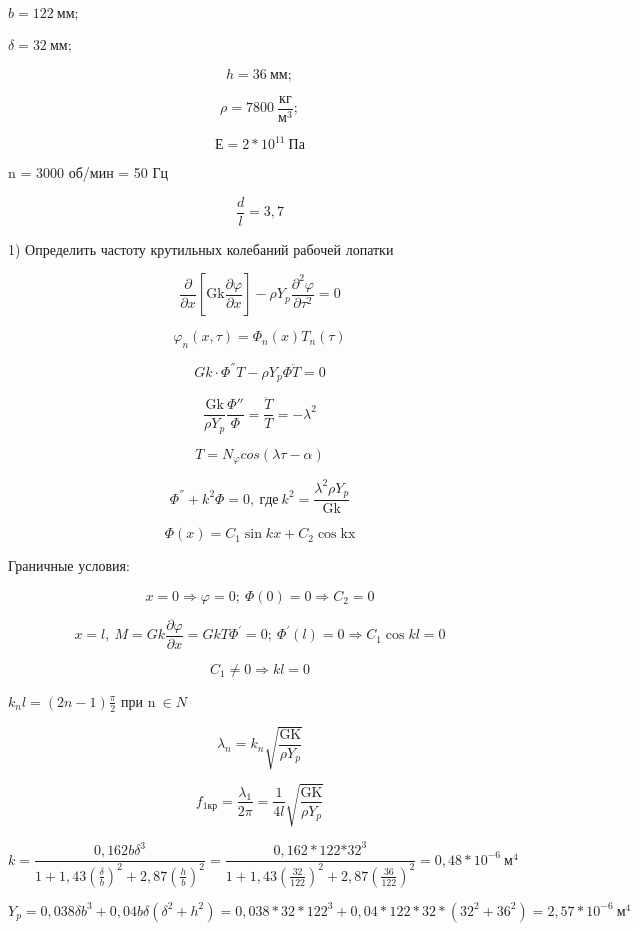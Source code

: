 \(b = 122\ мм;\)

\(\delta = 32\ мм;\) \(\ \)

\[h = 36\ мм;\]

\[\rho = 7800\ \frac{кг}{м^{3}};\]

\[Е = 2*10^{11}\ Па\]

n = 3000 об/мин = 50 Гц

\[\frac{d}{l} = 3,7\]

1) Определить частоту крутильных колебаний рабочей лопатки

\[\frac{\partial}{\partial x}\left\lbrack \text{Gk}\frac{\partial\varphi}{\partial x} \right\rbrack - \rho Y_{p}\frac{\partial^{2}\varphi}{\partial\tau^{2}} = 0\]

\[\varphi_{n}\left( x,\tau \right) = \Phi_{n}(x)T_{n}\left( \tau \right)\]

\[Gk\cdot\Phi^{''}T - \rho Y_{p}\Phi\ddot{T} = 0\]

\[\frac{\text{Gk}}{\rho Y_{p}}\frac{\Phi''}{\Phi} = \frac{\ddot{T}}{T} = - \lambda^{2}\]

\[T = N_{\varphi}cos(\lambda\tau - \alpha)\]

\[\Phi^{''} + k^{2}\Phi = 0,\ где\ k^{2} = \frac{\lambda^{2}\rho Y_{p}}{\text{Gk}}\]

\[\Phi\left( x \right) = C_{1}\sin{kx + C_{2}\cos\text{kx}}\]

Граничные условия:

\[x = 0 \Rightarrow \varphi = 0;\ \Phi\left( 0 \right) = 0 \Rightarrow C_{2} = 0\]

\[x = l,\ M = Gk\frac{\partial\varphi}{\partial x} = GkT\Phi^{'} = 0;\ \Phi^{'}\left( l \right) = 0 \Rightarrow C_{1}\cos{kl = 0}\]

\[C_{1} \neq 0 \Rightarrow kl = 0\]

\(k_{n}l = (2n - 1)\frac{\pi}{2}\) при n\(\  \in N\)

\[\lambda_{n} = k_{n}\sqrt{\frac{\text{GK}}{\rho Y_{p}}}\]

\[f_{1кр} = \frac{\lambda_{1}}{2\pi} = \frac{1}{4l}\sqrt{\frac{\text{GK}}{\rho Y_{p}}}\]

\[k = \frac{0,162b\delta^{3}}{1 + 1,43\left( \frac{\delta}{b} \right)^{2} + 2,87\left( \frac{h}{b} \right)^{2}} = \frac{0,162*122{*32}^{3}}{1 + 1,43\left( \frac{32}{122} \right)^{2} + 2,87\left( \frac{36}{122} \right)^{2}} = 0,48*10^{- 6}\ м^{4}\]

\[Y_{p} = 0,038\delta b^{3} + 0,04b\delta\left( \delta^{2} + h^{2} \right) = 0,038*32*122^{3} + 0,04*122*32*\left( 32^{2} + 36^{2} \right) = 2,57*10^{- 6}\ м^{4}\]

